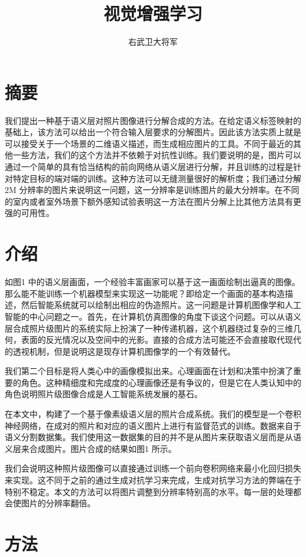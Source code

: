 \documentclass{ctexart}
\author{右武卫大将军}
\title{视觉增强学习}
\begin{document}
    \maketitle
    \section{摘要}
        我们提出一种基于语义层对照片图像进行分解合成的方法。在给定语义标签映射的基础上，该方法可以给出一个符合输入层要求的分解图片。因此该方法实质上就是可以接受关于一个场景的二维语义描述，而生成相应图片的工具。不同于最近的其他一些方法，我们的这个方法并不依赖于对抗性训练。我们要说明的是，图片可以通过一个简单的具有恰当结构的前向网络从语义层进行分解，并且训练的过程是针对特定目标的端对端的训练。这种方法可以无缝测量很好的解析度；我们通过分解2M 分辨率的图片来说明这一问题，这一分辨率是训练图片的最大分辨率。在不同的室内或者室外场景下额外感知试验表明这一方法在图片分解上比其他方法具有更强的可用性。
    \section{介绍}
        如图1 中的语义层画面，一个经验丰富画家可以基于这一画面绘制出逼真的图像。那么能不能训练一个机器模型来实现这一功能呢？即给定一个画面的基本构造描述，然后智能系统就可以绘制出相应的伪造照片。这一问题是计算机图像学和人工智能的中心问题之一。首先，在计算机仿真图像的角度下谈这个问题。可以从语义层合成照片级图片的系统实际上扮演了一种传递机器，这个机器绕过复杂的三维几何，表面的反光情况以及空间中的光影。直接的合成方法可能还不会直接取代现代的透视机制，但是说明这是现存计算机图像学的一个有效替代。

        我们第二个目标是将人类心中的画像模拟出来。心理画面在计划和决策中扮演了重要的角色。这种精细度和完成度的心理画像还是有争议的，但是它在人类认知中的角色说明照片级图像合成是人工智能系统发展的基石。

        在本文中，构建了一个基于像素级语义层的照片合成系统。我们的模型是一个卷积神经网络，在成对的照片和对应的语义图片上进行有监督范式的训练。数据来自于语义分割数据集。我们使用这一数据集的目的并不是从图片来获取语义层而是从语义层来合成图片。图片合成的结果如图1 所示。

        我们会说明这种照片级图像可以直接通过训练一个前向卷积网络来最小化回归损失来实现。这不同于之前的通过生成对抗学习来完成，生成对抗学习方法的弊端在于特别不稳定。本文的方法可以将图片调整到分辨率特别高的水平。每一层的处理都会使图片的分辨率翻倍。

    \section{方法}
\end{document}
